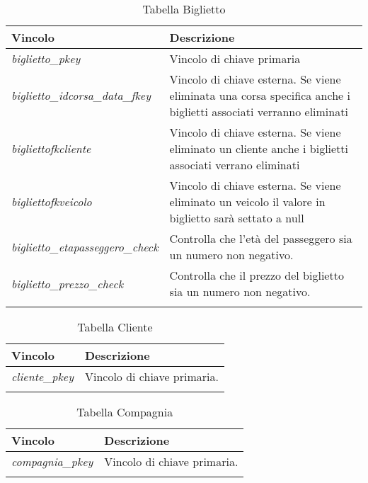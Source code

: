 \begin{longtable}{|| m{} | m{} ||}
    \hline\hline
     \textbf{Vincolo} & \textbf{Descrizione} \\ [1ex]
     \hline\hline
     \endfirsthead

      \textit{biglietto\_pkey} & Vincolo di chiave primaria  \\ [1ex]
      \hline

      \textit{biglietto\_idcorsa\_data\_fkey} & Vincolo di chiave esterna. Se viene eliminata una corsa specifica anche i biglietti associati verranno eliminati \\ [1ex]
     \hline

     \textit{bigliettofkcliente} & Vincolo di chiave esterna. Se viene eliminato un cliente anche i biglietti associati verrano eliminati \\ [1ex]
     \hline

     \textit{bigliettofkveicolo} & Vincolo di chiave esterna. Se viene eliminato un veicolo il valore in biglietto sarà settato a null \\ [1ex]
     \hline

     \textit{biglietto\_etapasseggero\_check} & Controlla che l'età del passeggero sia un numero non negativo. \\ [1ex]
     \hline

     \textit{biglietto\_prezzo\_check} & Controlla che il prezzo del biglietto sia un numero non negativo. \\ [1ex]
     \hline\hline

     \caption*{Tabella Biglietto} \\
\end{longtable}

\begin{longtable}{|| m{} | m{} ||}
    \hline\hline
     \textbf{Vincolo} & \textbf{Descrizione} \\ [1ex]
     \hline\hline
     \endfirsthead

      \textit{cliente\_pkey} & Vincolo di chiave primaria. \\ [1ex]
     \hline\hline

     \caption*{Tabella Cliente} \\
\end{longtable}

\begin{longtable}{|| m{} | m{} ||}
    \hline\hline
     \textbf{Vincolo} & \textbf{Descrizione} \\ [1ex]
     \hline\hline
     \endfirsthead

      \textit{compagnia\_pkey} & Vincolo di chiave primaria. \\ [1ex]
     \hline\hline

     \caption*{Tabella Compagnia} \\
\end{longtable}

